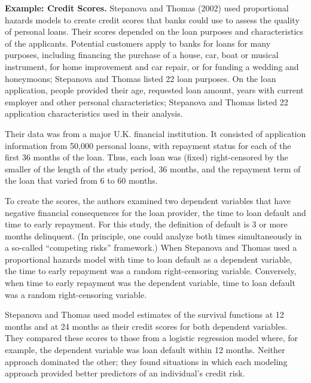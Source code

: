 \linejed{}

\textbf{ Example: Credit Scores.}
Stepanova and Thomas (2002) used proportional hazards models to
create credit scores that banks could use to assess the quality of
personal loans. Their scores depended on the loan purposes and
characteristics of the applicants. Potential customers apply to
banks for loans for many purposes, including financing the purchase
of a house, car, boat or musical instrument, for home improvement
and car repair, or for funding a wedding and honeymoons; Stepanova
and Thomas listed 22 loan purposes. On the loan application, people
provided their age, requested loan amount, years with current
employer and other personal characteristics; Stepanova and Thomas
listed 22 application characteristics used in their analysis.

Their data was from a major U.K. financial institution. It consisted
of application information from 50,000 personal loans, with
repayment status for each of the first 36 months of the loan. Thus,
each loan was (fixed) right-censored by the smaller of the length of
the study period, 36 months, and the repayment term of the loan that
varied from 6 to 60 months.

To create the scores, the authors examined two dependent variables
that have negative financial consequences for the loan provider, the
time to loan default and time to early repayment. For this study,
the definition of default is 3 or more months delinquent. (In
principle, one could analyze both times simultaneously in a
so-called ``competing risks'' framework.) When Stepanova and Thomas
used a proportional hazards model with time to loan default as a
dependent variable, the time to early repayment was a random
right-censoring variable. Conversely, when time to early repayment
was the dependent variable, time to loan default was a random
right-censoring variable.

Stepanova and Thomas used model estimates of the survival functions
at 12 months and at 24 months as their credit scores for both
dependent variables. They compared these scores to those from a
logistic regression model where, for example, the dependent variable
was loan default within 12 months. Neither approach dominated the
other; they found situations in which each modeling approach
provided better predictors of an individual's credit risk.

\linejed



